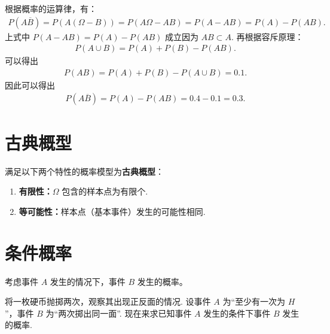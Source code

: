 \documentclass[12pt, a4paper, oneside, UTF8]{ctexbook}
\begin{document}
\begin{solution}
    根据概率的运算律，有：
    \begin{align*}
        P\left(A\overline{B}\right) = P\left(A \left(\Omega - B\right)\right) = P\left(A \Omega - AB\right) = P\left(A - AB\right) = P\left(A\right) - P\left(AB\right).
    \end{align*}
    上式中 \(P\left(A - AB\right) = P\left(A\right) - P\left(AB\right)\) 成立因为 \(AB \subset A\). 再根据容斥原理：
    \begin{align*}
        P\left(A\cup B\right) = P\left(A\right) + P\left(B\right) - P\left(AB\right).
    \end{align*}
    可以得出
    \begin{align*}
        P\left(AB\right) = P\left(A\right) + P\left(B\right) - P\left(A\cup B\right) = 0.1.
    \end{align*}
    因此可以得出
    \begin{align*}
        P\left(A\overline{B}\right) = P\left(A\right) - P\left(AB\right) = 0.4 - 0.1 = 0.3.
    \end{align*}
\end{solution}

\clearpage

\section{古典概型}

\begin{defn}
    满足以下两个特性的概率模型为\textbf{古典概型}：
    \begin{enumerate}
        \item \textbf{有限性：}\(\Omega\) 包含的样本点为有限个.
        \item \textbf{等可能性：}样本点（基本事件）发生的可能性相同.
    \end{enumerate}
\end{defn}

\section{条件概率}

考虑事件 \(A\) 发生的情况下，事件 \(B\) 发生的概率。

\begin{example}
    将一枚硬币抛掷两次，观察其出现正反面的情况. 设事件 \(A\) 为“至少有一次为 \(H\)”，事件 \(B\) 为“两次掷出同一面”. 现在来求已知事件 \(A\) 发生的条件下事件 \(B\) 发生的概率.
\end{example}
\end{document}
